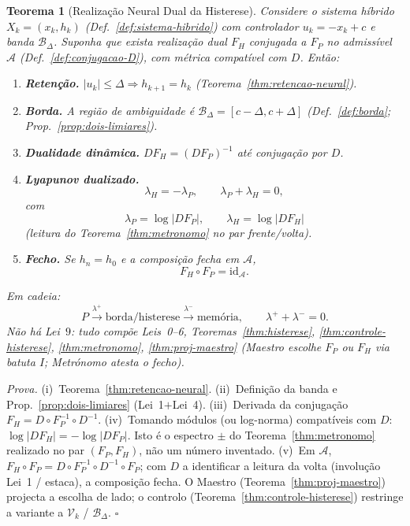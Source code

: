 \documentclass[11pt,a4paper]{article}
\newtheorem{teorema}{Teorema}
\begin{document}
\begin{teorema}[Realização Neural Dual da Histerese]\label{thm:rede-dual}
Considere o sistema híbrido $X_k=(x_k,h_k)$
(Def.~\ref{def:sistema-hibrido}) com controlador $u_k=-x_k+c$ e banda
$\mathcal{B}_{\Delta}$. Suponha que exista realização dual $F_H$
conjugada a $F_P$ no admissível $\mathcal{A}$
(Def.~\ref{def:conjugacao-D}), com métrica compatível com $D$. Então:
\begin{enumerate}
\item \textbf{Retenção.} $|u_k|\le\Delta\Rightarrow h_{k+1}=h_k$
(Teorema~\ref{thm:retencao-neural}).
\item \textbf{Borda.} A região de ambiguidade é
$\mathcal{B}_{\Delta}=[c-\Delta,c+\Delta]$
(Def.~\ref{def:borda}; Prop.~\ref{prop:dois-limiares}).
\item \textbf{Dualidade dinâmica.} $DF_H=(DF_P)^{-1}$ até conjugação
por $D$.
\item \textbf{Lyapunov dualizado.}
\[
\boxed{\lambda_H=-\lambda_P},
\qquad
\boxed{\lambda_P+\lambda_H=0},
\]
com
\[
\lambda_P=\log|DF_P|,\qquad
\lambda_H=\log|DF_H|
\]
(leitura do Teorema~\ref{thm:metronomo} no par frente/volta).
\item \textbf{Fecho.} Se $h_n=h_0$ e a composição fecha em $\mathcal{A}$,
\[
\boxed{F_H\circ F_P=\mathrm{id}_{\mathcal{A}}}.
\]
\end{enumerate}
Em cadeia:
\[
\boxed{
P
\overset{\lambda^{+}}{\longrightarrow}
\text{borda/histerese}
\overset{\lambda^{-}}{\longrightarrow}
\text{memória},
\qquad
\lambda^{+}+\lambda^{-}=0.
}
\]
\emph{Não} há Lei~$9$: tudo compõe Leis~0--6, Teoremas~\ref{thm:histerese},
\ref{thm:controle-histerese}, \ref{thm:metronomo},
\ref{thm:proj-maestro} (Maestro escolhe $F_P$ ou $F_H$ via batuta
$I$; Metrónomo atesta o fecho).
\end{teorema}

\emph{Prova.} (i)~Teorema~\ref{thm:retencao-neural}. (ii)~Definição da
banda e Prop.~\ref{prop:dois-limiares} (Lei~1$+$Lei~4). (iii)~Derivada
da conjugação $F_H=D\circ F_P^{-1}\circ D^{-1}$. (iv)~Tomando módulos
(ou log-norma) compatíveis com $D$:
$\log|DF_H|=-\log|DF_P|$. Isto é o espectro $\pm$ do
Teorema~\ref{thm:metronomo} realizado no par $(F_P,F_H)$, não um
número inventado. (v)~Em $\mathcal{A}$,
$F_H\circ F_P=D\circ F_P^{-1}\circ D^{-1}\circ F_P$; com $D$ a
identificar a leitura da volta (involução Lei~1 / estaca), a composição
fecha. O Maestro (Teorema~\ref{thm:proj-maestro}) projecta a escolha
de lado; o controlo (Teorema~\ref{thm:controle-histerese}) restringe a
variante a $\mathcal{V}_k$ / $\mathcal{B}_{\Delta}$. $\square$
\end{document}
